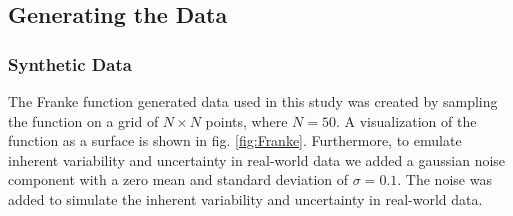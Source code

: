 \documentclass[aps,pra,english,notitlepage,reprint,nofootinbib]{revtex4-1}  %
\begin{document}




\subsection{Generating the Data}
\subsubsection{Synthetic Data}
The Franke function generated data used in this study was created by sampling the function on a grid of $N\times N$ points, where $N=50$. A visualization of the function as a surface is shown in fig. \ref{fig:Franke}. Furthermore, to emulate inherent variability and uncertainty in real-world data we added a gaussian noise component with a zero mean and standard deviation of $\sigma = 0.1$. The noise was added to simulate the inherent variability and uncertainty in real-world data.
\end{document}
